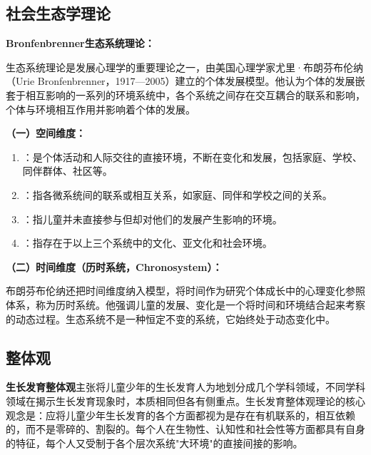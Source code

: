 \subsection{社会生态学理论}

\begin{keybox}
\textbf{Bronfenbrenner生态系统理论：}

生态系统理论是发展心理学的重要理论之一，由美国心理学家尤里·布朗芬布伦纳（Urie Bronfenbrenner，1917—2005）建立的个体发展模型。他认为个体的发展嵌套于相互影响的一系列的环境系统中，各个系统之间存在交互耦合的联系和影响，个体与环境相互作用并影响着个体的发展。

\textbf{（一）空间维度：}
\begin{enumerate}[leftmargin=*]
    \item {}：是个体活动和人际交往的直接环境，不断在变化和发展，包括家庭、学校、同伴群体、社区等。
    \item {}：指各微系统间的联系或相互关系，如家庭、同伴和学校之间的关系。
    \item {}：指儿童并未直接参与但却对他们的发展产生影响的环境。
    \item {}：指存在于以上三个系统中的文化、亚文化和社会环境。
\end{enumerate}

\textbf{（二）时间维度（历时系统，Chronosystem）：}

布朗芬布伦纳还把时间维度纳入模型，将时间作为研究个体成长中的心理变化参照体系，称为历时系统。他强调儿童的发展、变化是一个将时间和环境结合起来考察的动态过程。生态系统不是一种恒定不变的系统，它始终处于动态变化中。
\end{keybox}

\subsection{整体观}

\begin{defbox}
\textbf{生长发育整体观}主张将儿童少年的生长发育人为地划分成几个学科领域，不同学科领域在揭示生长发育现象时，本质相同但各有侧重点。生长发育整体观理论的核心观念是：应将儿童少年生长发育的各个方面都视为是存在有机联系的，相互依赖的，而不是零碎的、割裂的。每个人在生物性、认知性和社会性等方面都具有自身的特征，每个人又受制于各个层次系统"大环境"的直接间接的影响。
\end{defbox}

\newpage
